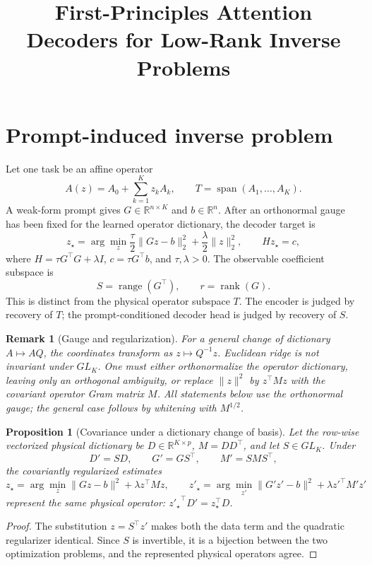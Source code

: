 \documentclass[11pt]{article}
\title{First-Principles Attention Decoders for Low-Rank Inverse Problems}
\author{}
\date{}
\newtheorem{proposition}{Proposition}
\newtheorem{remark}{Remark}
\newcommand{\R}{\mathbb R}
\newcommand{\range}{\operatorname{range}}
\newcommand{\rank}{\operatorname{rank}}
\begin{document}
\maketitle

\section{Prompt-induced inverse problem}

Let one task be an affine operator
\[
 A(z)=A_0+\sum_{k=1}^K z_k A_k,
 \qquad T=\operatorname{span}(A_1,\ldots,A_K).
\]
A weak-form prompt gives $G\in\R^{n\times K}$ and $b\in\R^n$.  After an
orthonormal gauge has been fixed for the learned operator dictionary, the
decoder target is
\begin{equation}
 z_\star=\arg\min_z
 \frac{\tau}{2}\|Gz-b\|_2^2+\frac{\lambda}{2}\|z\|_2^2,
 \qquad
 H z_\star=c,
 \label{eq:ridge}
\end{equation}
where $H=\tau G^\top G+\lambda I$, $c=\tau G^\top b$, and
$\tau,\lambda>0$.  The observable coefficient subspace is
\[
 S=\range(G^\top),\qquad r=\rank(G).
\]
This is distinct from the physical operator subspace $T$.  The encoder is
judged by recovery of $T$; the prompt-conditioned decoder head is judged by
recovery of $S$.

\begin{remark}[Gauge and regularization]
For a general change of dictionary $A\mapsto AQ$, the coordinates transform as
$z\mapsto Q^{-1}z$.  Euclidean ridge is not invariant under $GL_K$.  One must
either orthonormalize the operator dictionary, leaving only an orthogonal
ambiguity, or replace $\|z\|^2$ by $z^\top Mz$ with the covariant operator Gram
matrix $M$.  All statements below use the orthonormal gauge; the general case
follows by whitening with $M^{1/2}$.
\end{remark}

\begin{proposition}[Covariance under a dictionary change of basis]
Let the row-wise vectorized physical dictionary be $D\in\R^{K\times p}$,
$M=DD^\top$, and let $S\in GL_K$.  Under
\[
 D'=SD,\qquad G'=GS^\top,\qquad M'=SMS^\top,
\]
the covariantly regularized estimates
\[
 z_\star=\arg\min_z\|Gz-b\|^2+\lambda z^\top Mz,
 \qquad
 z'_\star=\arg\min_{z'}\|G'z'-b\|^2+\lambda {z'}^\top M'z'
\]
represent the same physical operator: ${z'_\star}^\top D'=z_\star^\top D$.
\end{proposition}
\begin{proof}
The substitution $z=S^\top z'$ makes both the data term and the quadratic
regularizer identical.  Since $S$ is invertible, it is a bijection between
the two optimization problems, and the represented physical operators agree.
\end{proof}
\end{document}
